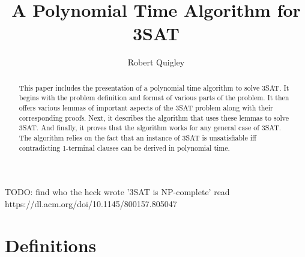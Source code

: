 \documentclass[manuscript]{acmart}
\begin{document}
    \title{A Polynomial Time Algorithm for 3SAT} %
    \author{Robert Quigley}
    
    \begin{abstract}
        This paper includes the presentation of a polynomial time algorithm to
        solve 3SAT. It begins with the problem definition and format of various
        parts of the problem. It then offers various lemmas of important aspects of 
        the 3SAT problem along with their corresponding proofs. Next, it describes
        the algorithm that uses these lemmas to solve 3SAT. And finally, it proves
        that the algorithm works for any general case of 3SAT. The algorithm relies
        on the fact that an instance of 3SAT is unsatisfiable iff contradicting
        1-terminal clauses can be derived in polynomial time.
    \end{abstract}
    
    
    \maketitle %
    
    
    TODO: find who the heck wrote '3SAT is NP-complete'
    read https://dl.acm.org/doi/10.1145/800157.805047
    
    \section{Definitions}
\end{document}
